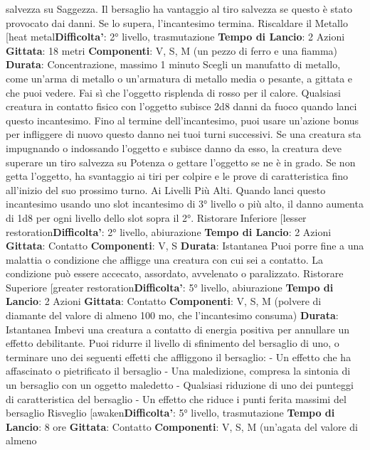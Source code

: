 \begin{multicols}{2}
salvezza su Saggezza. Il bersaglio ha vantaggio al tiro
salvezza se questo è stato provocato dai danni. Se lo
supera, l’incantesimo termina.
Riscaldare il Metallo
[heat metal\textbf{Difficolta'}:
2° livello, trasmutazione
\textbf{Tempo di Lancio}: 2 Azioni
\textbf{Gittata}: 18 metri
\textbf{Componenti}: V, S, M (un pezzo di ferro e una fiamma)
\textbf{Durata}: Concentrazione, massimo 1 minuto
Scegli un manufatto di metallo, come un’arma di
metallo o un’armatura di metallo media o pesante, a
gittata e che puoi vedere. Fai sì che l’oggetto risplenda
di rosso per il calore. Qualsiasi creatura in contatto
fisico con l’oggetto subisce 2d8 danni da fuoco quando
lanci questo incantesimo. Fino al termine
dell’incantesimo, puoi usare un’azione bonus per
infliggere di nuovo questo danno nei tuoi turni
successivi.
Se una creatura sta impugnando o indossando l’oggetto
e subisce danno da esso, la creatura deve superare un
tiro salvezza su Potenza o gettare l’oggetto se ne è
in grado. Se non getta l’oggetto, ha svantaggio ai tiri per
colpire e le prove di caratteristica fino all’inizio del suo
prossimo turno.
Ai Livelli Più Alti. Quando lanci questo incantesimo
usando uno slot incantesimo di 3° livello o più alto, il
danno aumenta di 1d8 per ogni livello dello slot sopra il
2°.
Ristorare Inferiore
[lesser restoration\textbf{Difficolta'}:
2° livello, abiurazione
\textbf{Tempo di Lancio}: 2 Azioni
\textbf{Gittata}: Contatto
\textbf{Componenti}: V, S
\textbf{Durata}: Istantanea
Puoi porre fine a una malattia o condizione che affligge
una creatura con cui sei a contatto. La condizione può
essere accecato, assordato, avvelenato o paralizzato.
Ristorare Superiore
[greater restoration\textbf{Difficolta'}:
5° livello, abiurazione
\textbf{Tempo di Lancio}: 2 Azioni
\textbf{Gittata}: Contatto
\textbf{Componenti}: V, S, M (polvere di diamante del valore di
almeno 100 mo, che l’incantesimo consuma)
\textbf{Durata}: Istantanea
Imbevi una creatura a contatto di energia positiva per
annullare un effetto debilitante. Puoi ridurre il livello di
sfinimento del bersaglio di uno, o terminare uno dei
seguenti effetti che affliggono il bersaglio:
- Un effetto che ha affascinato o pietrificato il
bersaglio
- Una maledizione, compresa la sintonia di un
bersaglio con un oggetto maledetto
- Qualsiasi riduzione di uno dei punteggi di
caratteristica del bersaglio
- Un effetto che riduce i punti ferita massimi del
bersaglio
Risveglio
[awaken\textbf{Difficolta'}:
5° livello, trasmutazione
\textbf{Tempo di Lancio}: 8 ore
\textbf{Gittata}: Contatto
\textbf{Componenti}: V, S, M (un’agata del valore di almeno

\end{multicols}
